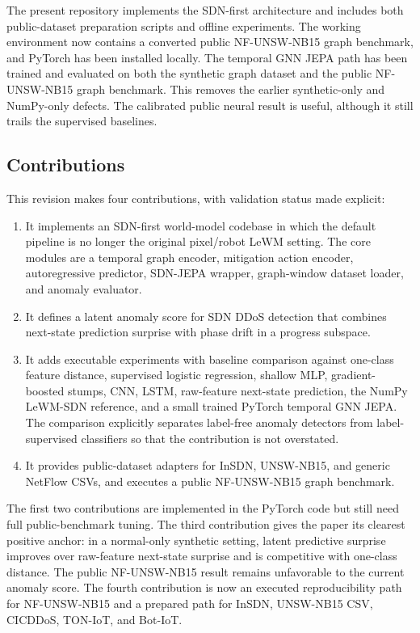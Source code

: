 \documentclass[runningheads]{llncs}
\begin{document}
The present repository implements the SDN-first architecture and includes both
public-dataset preparation scripts and offline experiments. The working
environment now contains a converted public NF-UNSW-NB15 graph benchmark, and
PyTorch has been installed locally. The temporal GNN JEPA path has been trained
and evaluated on both the synthetic graph dataset and the public NF-UNSW-NB15
graph benchmark. This removes the earlier synthetic-only and NumPy-only
defects. The calibrated public neural result is useful, although it still
trails the supervised baselines.

\subsection{Contributions}

This revision makes four contributions, with validation status made explicit:

\begin{enumerate}
  \item It implements an SDN-first world-model codebase in which the default
  pipeline is no longer the original pixel/robot LeWM setting. The core modules
  are a temporal graph encoder, mitigation action encoder, autoregressive
  predictor, SDN-JEPA wrapper, graph-window dataset loader, and anomaly
  evaluator.
  \item It defines a latent anomaly score for SDN DDoS detection that combines
  next-state prediction surprise with phase drift in a progress subspace.
  \item It adds executable experiments with baseline comparison against
  one-class feature distance, supervised logistic regression, shallow MLP,
  gradient-boosted stumps, CNN, LSTM, raw-feature next-state prediction, the
  NumPy LeWM-SDN reference, and a small trained PyTorch temporal GNN JEPA.
  The comparison explicitly separates label-free anomaly detectors from
  label-supervised classifiers so that the contribution is not overstated.
  \item It provides public-dataset adapters for InSDN, UNSW-NB15, and generic
  NetFlow CSVs, and executes a public NF-UNSW-NB15 graph benchmark.
\end{enumerate}

The first two contributions are implemented in the PyTorch code but still need
full public-benchmark tuning. The third contribution gives the paper its
clearest positive anchor: in a normal-only synthetic setting, latent predictive
surprise improves over raw-feature next-state surprise and is competitive with
one-class distance. The public NF-UNSW-NB15 result remains unfavorable to the
current anomaly score. The fourth contribution is now an executed
reproducibility path for NF-UNSW-NB15 and a prepared path for InSDN, UNSW-NB15
CSV, CICDDoS, TON-IoT, and Bot-IoT.
\end{document}
